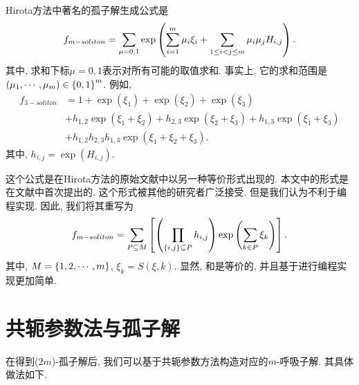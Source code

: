 Hirota方法中著名的孤子解生成公式是\cite{hirota1973exact}
\begin{equation}
    f_{m-soliton}=\sum_{\mu=0,1}\exp\left(\sum_{i=1}^m{\mu_i \xi_i}+\sum_{1\le i<j\le m}{\mu_i\mu_jH_{i,j}}\right). \label{f-soliton-old}
\end{equation}
其中, 求和下标$\mu=0,1$表示对所有可能的取值求和. 事实上, 它的求和范围是$\left(\mu_1,\cdots,\mu_m\right)\in \left\{0,1\right\}^m$. 例如, 
\begin{equation}
\begin{split}
f_{3-soliton}&=1+\exp(\xi_1)+\exp(\xi_2)+\exp(\xi_3)\\
&+h_{1,2}\exp(\xi_1+\xi_2)+h_{2,3}\exp(\xi_2+\xi_3)+h_{1,3}\exp(\xi_1+\xi_3)\\
&+h_{1,2}h_{2,3}h_{1,3}\exp(\xi_1+\xi_2+\xi_3).
\end{split}
\end{equation}
其中, $h_{i,j}=\exp(H_{i,j})$.

这个公式是在Hirota方法的原始文献\cite{hirota1971exact}中以另一种等价形式出现的. 本文中的形式是在文献\cite{hirota1973exact}中首次提出的. 这个形式被其他的研究者广泛接受. 但是我们认为不利于编程实现. 因此, 我们将其重写为
\begin{equation}
    f_{m-soliton}=\sum_{P\subseteq M}\left[\left(\prod_{\left\{i,j\right\}\subseteq P}{h_{i,j}}\right)\exp\left(\sum_{k\in P}{\xi_k}\right)\right]. \label{f-soliton-new}
\end{equation}
其中, $M=\left\{1,2,\cdots,m\right\}$, $\xi_k=S(\xi,k)$. 显然, 和是等价的, 并且基于进行编程实现更加简单.

\section{共轭参数法与孤子解}
在得到($2m$)-孤子解后, 我们可以基于共轭参数方法构造对应的$m$-呼吸子解\cite{tajiri1989breather}. 其具体做法如下.

